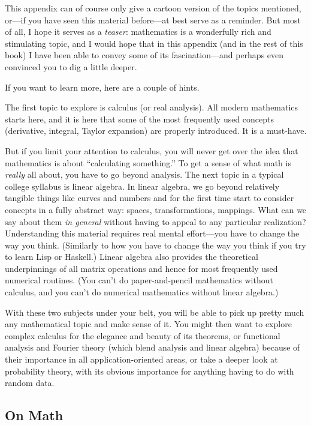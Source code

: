 This appendix can of course only give a cartoon version of the topics
mentioned, or---if you have seen this material before---at best serve
as a reminder.  But most of all, I hope it serves as a \emph{teaser}:
mathematics is a wonderfully rich and stimulating topic, and I would
hope that in this appendix (and in the rest of this book) I have been
able to convey some of its fascination---and perhaps even convinced
you to dig a little deeper.

If you want to learn more, here are a couple of hints.

The first topic to explore is calculus (or real analysis). All modern
mathematics starts here, and it is here that some of the most
frequently used concepts (derivative, integral, Taylor expansion) are
properly introduced. It is a must-have.

But if you limit your attention to calculus, you will never get
over the idea that mathematics is about ``calculating something.'' To
get a sense of what math is \emph{really} all about, you have to go
beyond analysis. The next topic in a typical college syllabus is
linear algebra.  In linear algebra, we go beyond relatively tangible
things like curves and numbers and for the first time start to
consider concepts in a fully abstract way: spaces, transformations,
mappings.  What can we say\vadjust{\pagebreak} about them \emph{in general} without having
to appeal to any particular realization? Understanding this material
requires real mental effort---you have to change the way you think.
(Similarly to how  you have to change the way you think if you try to
learn Lisp or Haskell.) Linear algebra also provides the theoretical
underpinnings of all matrix operations and hence for most
frequently used numerical routines. (You can't do paper-and-pencil
mathematics without calculus, and you can't do numerical mathematics
without linear algebra.)

With these two subjects under your belt, you will be able to pick up
pretty much any mathematical topic and make sense of it.  You might
then want to explore complex calculus for the elegance and beauty of
its theorems, or functional analysis and Fourier theory (which blend
analysis and linear algebra) because of their importance in all
application-oriented areas, or take a deeper look at probability
theory, with its obvious importance for anything having to do with
random data.

\subsection{On Math}

